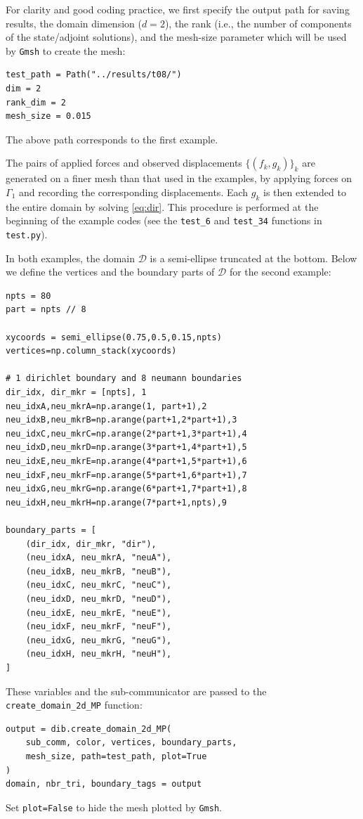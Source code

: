 \documentclass[preprint,9pt]{elsarticle}
\begin{document}
For clarity and good coding practice, we first specify
the output path for saving results,
the domain dimension ($d=2$),
the rank (i.e., the number of components of the state/adjoint solutions),
and the mesh-size parameter which will be used by
\texttt{Gmsh} to create the mesh:
\begin{lstlisting}
test_path = Path("../results/t08/")
dim = 2
rank_dim = 2
mesh_size = 0.015
\end{lstlisting}
The above path corresponds to the first example.

The pairs of applied forces and observed displacements $\{(f_k,g_k)\}_k$
are generated on a finer mesh than that used in the examples,
by applying forces on $\Gamma_1$ and recording the corresponding displacements.
Each $g_k$ is then extended to the entire domain by solving \eqref{eq:dir}.
This procedure is performed at the beginning of the example codes
(see the \texttt{test\_6} and \texttt{test\_34} functions in \texttt{test.py}).

In both examples, the domain $\mathcal{D}$ is a semi-ellipse truncated at the bottom.
Below we define the vertices and the boundary parts of $\mathcal{D}$ for the second example:

\begin{lstlisting}
npts = 80
part = npts // 8

xycoords = semi_ellipse(0.75,0.5,0.15,npts)
vertices=np.column_stack(xycoords)

# 1 dirichlet boundary and 8 neumann boundaries
dir_idx, dir_mkr = [npts], 1
neu_idxA,neu_mkrA=np.arange(1, part+1),2
neu_idxB,neu_mkrB=np.arange(part+1,2*part+1),3
neu_idxC,neu_mkrC=np.arange(2*part+1,3*part+1),4
neu_idxD,neu_mkrD=np.arange(3*part+1,4*part+1),5
neu_idxE,neu_mkrE=np.arange(4*part+1,5*part+1),6
neu_idxF,neu_mkrF=np.arange(5*part+1,6*part+1),7
neu_idxG,neu_mkrG=np.arange(6*part+1,7*part+1),8
neu_idxH,neu_mkrH=np.arange(7*part+1,npts),9

boundary_parts = [
	(dir_idx, dir_mkr, "dir"),
	(neu_idxA, neu_mkrA, "neuA"),
	(neu_idxB, neu_mkrB, "neuB"),
	(neu_idxC, neu_mkrC, "neuC"),
	(neu_idxD, neu_mkrD, "neuD"),
	(neu_idxE, neu_mkrE, "neuE"),
	(neu_idxF, neu_mkrF, "neuF"),
	(neu_idxG, neu_mkrG, "neuG"),
	(neu_idxH, neu_mkrH, "neuH"),
]
\end{lstlisting}

These variables and the sub-communicator are passed to
the \texttt{create\_domain\_2d\_MP} function:
\begin{lstlisting}
output = dib.create_domain_2d_MP(
	sub_comm, color, vertices, boundary_parts,
	mesh_size, path=test_path, plot=True
)
domain, nbr_tri, boundary_tags = output	
\end{lstlisting}
Set \texttt{plot=False} to hide the mesh plotted by \texttt{Gmsh}.
\end{document}
